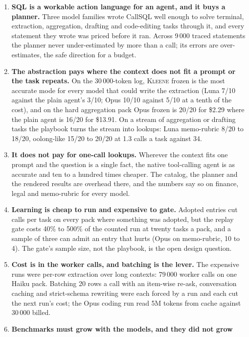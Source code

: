 \documentclass[11pt,a4paper]{article}
\newcommand{\kleene}{\textsc{Kleene}}
\newcommand{\callsql}{CallSQL}
\begin{document}
\begin{enumerate}[leftmargin=1.5em,itemsep=3pt]
\item \textbf{SQL is a workable action language for an agent, and it buys a
  planner.} Three model families wrote \callsql{} well enough to solve
  terminal, extraction, aggregation, drafting and code-editing tasks through
  it, and every statement they wrote was priced before it ran. Across 9\,000
  traced statements the planner never under-estimated by more than a call;
  its errors are over-estimates, the safe direction for a budget.
\item \textbf{The abstraction pays where the context does not fit a prompt
  or the task repeats.} On the 30\,000-token log, \kleene{} frozen is the
  most accurate mode for every model that could write the extraction (Luna
  7/10 against the plain agent's 3/10; Opus 10/10 against 5/10 at a tenth
  of the cost), and on the hard aggregation pack Opus frozen is 20/20 for
  \$2.29 where the plain agent is 16/20 for \$13.91. On a stream of
  aggregation or drafting tasks the playbook turns the stream into lookups:
  Luna memo-rubric 8/20 to 18/20, oolong-like 15/20 to 20/20 at 1.3 calls a
  task against 34.
\item \textbf{It does not pay for one-call lookups.} Wherever the context
  fits one prompt and the question is a single fact, the native
  tool-calling agent is as accurate and ten to a hundred times cheaper. The
  catalog, the planner and the rendered results are overhead there, and the
  numbers say so on finance, legal and memo-rubric for every model.
\item \textbf{Learning is cheap to run and expensive to gate.} Adopted
  entries cut calls per task on every pack where something was adopted, but
  the replay gate costs 40\% to 500\% of the counted run at twenty tasks a
  pack, and a sample of three can admit an entry that hurts (Opus on
  memo-rubric, 10 to 4). The gate's sample size, not the playbook, is the
  open design question.
\item \textbf{Cost is in the worker calls, and batching is the lever.}
  The expensive runs were per-row extraction over long contexts: 79\,000
  worker calls on one Haiku pack. Batching 20 rows a call with an item-wise
  re-ask, conversation caching and strict-schema rewriting were each forced
  by a run and each cut the next run's cost; the Opus coding run read 5M
  tokens from cache against 30\,000 billed.
\item \textbf{Benchmarks must grow with the models, and they did not grow
}
\end{enumerate}
\end{document}
